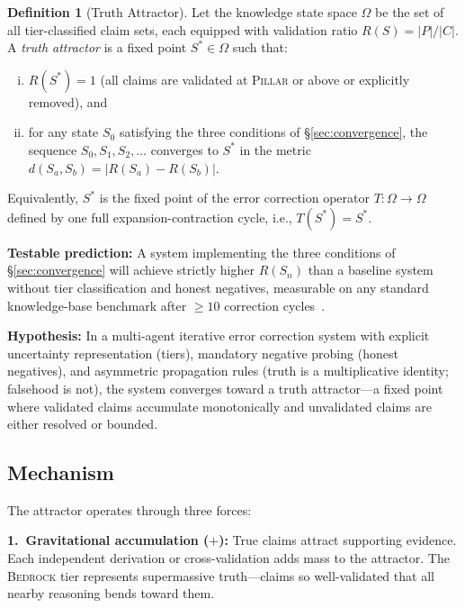 \documentclass[11pt]{article}
\theoremstyle{definition}
\newtheorem{definition}[theorem]{Definition}
\theoremstyle{remark}
\newcommand{\BEDROCK}{\textsc{Bedrock}}
\newcommand{\PILLAR}{\textsc{Pillar}}
\begin{document}
\begin{definition}[Truth Attractor]
\label{def:truth-attractor}
Let the knowledge state space $\Omega$ be the set of all tier-classified claim
sets, each equipped with validation ratio $R(S) = |P|/|C|$.
A \emph{truth attractor} is a fixed point $S^* \in \Omega$ such that:
\begin{enumerate}[(i)]
  \item $R(S^*) = 1$ (all claims are validated at \PILLAR{} or above or
    explicitly removed), and
  \item for any state $S_0$ satisfying the three conditions of
    \S\ref{sec:convergence}, the sequence $S_0, S_1, S_2, \ldots$ converges to
    $S^*$ in the metric $d(S_a, S_b) = |R(S_a) - R(S_b)|$.
\end{enumerate}
Equivalently, $S^*$ is the fixed point of the error correction operator
$T:\Omega\to\Omega$ defined by one full expansion-contraction cycle, i.e.,
$T(S^*) = S^*$.
\end{definition}

\medskip
\noindent\textbf{Testable prediction:}  A system implementing the three
conditions of \S\ref{sec:convergence} will achieve strictly higher $R(S_n)$
than a baseline system without tier classification and honest negatives,
measurable on any standard knowledge-base benchmark after $\geq 10$ correction
cycles~\cite{lin2022truthfulqa,li2023halueval}.

\medskip
\noindent\textbf{Hypothesis:}  In a multi-agent iterative error correction
system with explicit uncertainty representation (tiers), mandatory negative
probing (honest negatives), and asymmetric propagation rules (truth is a
multiplicative identity; falsehood is not), the system converges toward a truth
attractor---a fixed point where validated claims accumulate monotonically and
unvalidated claims are either resolved or bounded.

\subsection{Mechanism}
\label{sec:attractor-mechanism}

The attractor operates through three forces:

\medskip
\noindent\textbf{1.\ Gravitational accumulation ($+$):}  True claims attract
supporting evidence.  Each independent derivation or cross-validation adds mass
to the attractor.  The \BEDROCK{} tier represents supermassive truth---claims
so well-validated that all nearby reasoning bends toward them.
\end{document}
